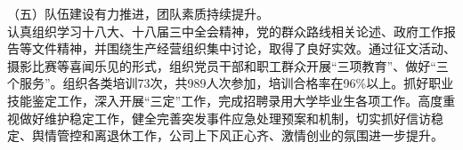 （五）队伍建设有力推进，团队素质持续提升。\\
\indent 认真组织学习十八大、十八届三中全会精神，党的群众路线相关论述、政府工作报告等文件精神，并围绕生产经营组织集中讨论，取得了良好实效。通过征文活动、摄影比赛等喜闻乐见的形式，组织党员干部和职工群众开展“三项教育”、做好“三个服务”。组织各类培训73次，共989人次参加，培训合格率在96\%以上。抓好职业技能鉴定工作，深入开展“三定”工作，完成招聘录用大学毕业生各项工作。高度重视做好维护稳定工作，健全完善突发事件应急处理预案和机制，切实抓好信访稳定、舆情管控和离退休工作，公司上下风正心齐、激情创业的氛围进一步提升。










